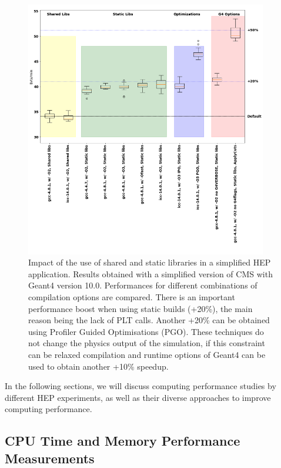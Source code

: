 \documentclass[12pt,a4paper]{article}
\begin{document}
{\begin{figure}[bthp]
\vspace*{0.3cm}
\centering
\includegraphics[width=0.94\textwidth]{image11.png}
\caption{Impact of the use of shared and static libraries in a
simplified HEP application. Results obtained with a simplified version
of CMS with Geant4 version 10.0. Performances for different combinations
of compilation options are compared. There is an important performance
boost when using static builds (+20\%), the main reason being the lack
of PLT calls. Another +20\% can be obtained using Profiler Guided
Optimisations (PGO). These techniques do not change the physics output
of the simulation, if this constraint can be relaxed compilation and
runtime options of Geant4 can be used to obtain another +10\% speedup. }
\label{fig:perflib}
\end{figure}

In the following sections, we will discuss computing performance studies
by different HEP experiments, as well as their diverse approaches to
improve computing performance.

\hypertarget{cpu-time-and-memory-performance-measurements}{%
\subsection{CPU Time and Memory Performance
Measurements}\label{cpu-time-and-memory-performance-measurements}}

}
\end{document}
